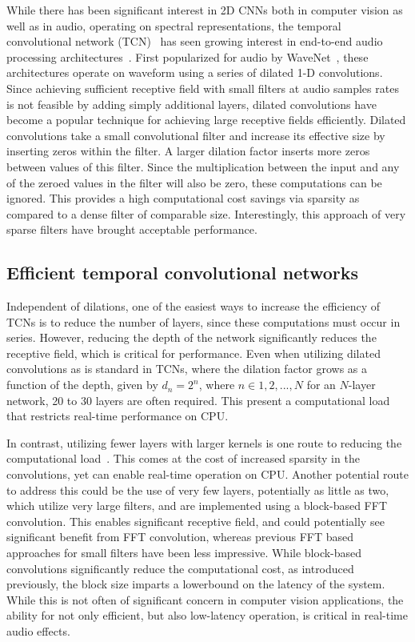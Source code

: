 \documentclass{article}
\begin{document}
While there has been significant interest in 2D CNNs both in computer vision as well as in audio, operating on spectral representations,
the temporal convolutional network (TCN)~\cite{bai2018tcn} has seen growing interest in end-to-end audio processing architectures~\cite{rethage2018wavenet}.
First popularized for audio by WaveNet~\cite{oord2016wavenet}, these architectures operate on waveform using a series of dilated 1-D convolutions. 
Since achieving sufficient receptive field with small filters at audio samples rates is not feasible by adding simply additional layers, 
dilated convolutions have become a popular technique for achieving large receptive fields efficiently. 
Dilated convolutions take a small convolutional filter and increase its effective size by inserting zeros within the filter. 
A larger dilation factor inserts more zeros between values of this filter. 
Since the multiplication between the input and any of the zeroed values in the filter will also be zero, these computations can be ignored. 
This provides a high computational cost savings via sparsity as compared to a dense filter of comparable size. 
Interestingly, this approach of very sparse filters have brought acceptable performance.

\subsection{Efficient temporal convolutional networks}

Independent of dilations, one of the easiest ways to increase the efficiency of TCNs is to reduce the number of layers, 
since these computations must occur in series. 
However, reducing the depth of the network significantly reduces the receptive field, which is critical for performance. 
Even when utilizing dilated convolutions as is standard in TCNs, where the dilation factor grows as a function of the depth, 
given by $d_n = 2^n$, where $n \in 1, 2, ..., N$ for an $N$-layer network, 20 to 30 layers are often required.
This present a computational load that restricts real-time performance on CPU.

In contrast, utilizing fewer layers with larger kernels is one route to reducing the computational load~\cite{steinmetz2021efficient}.
This comes at the cost of increased sparsity in the convolutions, yet can enable real-time operation on CPU. 
Another potential route to address this could be the use of very few layers, potentially as little as two, 
which utilize very large filters, and are implemented using a block-based FFT convolution. 
This enables significant receptive field, and could potentially see significant benefit from 
FFT convolution, whereas previous FFT based approaches for small filters have been less impressive. 
While block-based convolutions significantly reduce the computational cost,
as introduced previously, the block size imparts a lowerbound on the latency of the system. 
While this is not often of significant concern in computer vision applications, 
the ability for not only efficient, but also low-latency operation, is critical in real-time audio effects. 
\end{document}
